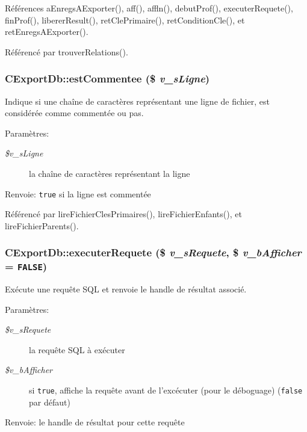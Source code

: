 Références aEnregsAExporter(), aff(), affln(), debutProf(), executerRequete(), finProf(), libererResult(), retClePrimaire(), retConditionCle(), et retEnregsAExporter().

Référencé par trouverRelations().
\subsubsection{\setlength{\rightskip}{0pt plus 5cm}CExportDb::estCommentee (\$ {\em v\_\-sLigne})}\label{class_c_export_db_e3fbf2c79078c4cc71b35edb55a08c8a}


Indique si une chaîne de caractères représentant une ligne de fichier, est considérée comme commentée ou pas. 

\begin{Desc}
\item[Paramètres:]
\begin{description}
\item[{\em \$v\_\-sLigne}]la chaîne de caractères représentant la ligne\end{description}
\end{Desc}
\begin{Desc}
\item[Renvoie:]{\tt true} si la ligne est commentée \end{Desc}


Référencé par lireFichierClesPrimaires(), lireFichierEnfants(), et lireFichierParents().
\subsubsection{\setlength{\rightskip}{0pt plus 5cm}CExportDb::executerRequete (\$ {\em v\_\-sRequete}, \/  \$ {\em v\_\-bAfficher} = {\tt FALSE})}\label{class_c_export_db_dbb783eb9f178cc86216855f50e73cd4}


Exécute une requête SQL et renvoie le handle de résultat associé. 

\begin{Desc}
\item[Paramètres:]
\begin{description}
\item[{\em \$v\_\-sRequete}]la requête SQL à exécuter \item[{\em \$v\_\-bAfficher}]si {\tt true}, affiche la requête avant de l'excécuter (pour le déboguage) ({\tt false} par défaut)\end{description}
\end{Desc}
\begin{Desc}
\item[Renvoie:]le handle de résultat pour cette requête \end{Desc}


